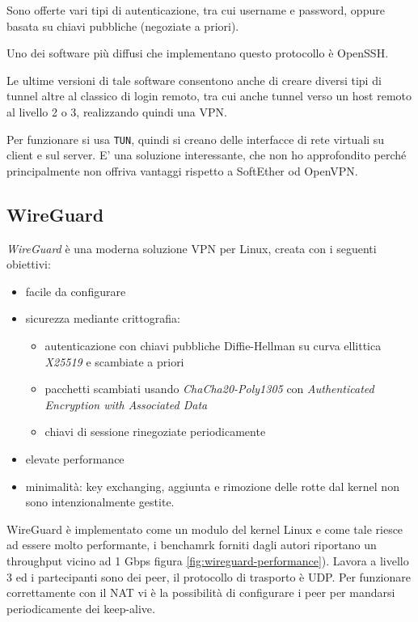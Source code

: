 Sono offerte vari tipi di autenticazione, tra cui username e password, oppure basata
su chiavi pubbliche (negoziate a priori).

Uno dei software più diffusi che implementano questo protocollo è OpenSSH.

Le ultime versioni di tale software consentono anche di creare
diversi tipi di tunnel altre al classico di login remoto, tra cui anche tunnel verso
un host remoto al livello 2 o 3, realizzando quindi una VPN.

Per funzionare si usa \texttt{TUN}, quindi si creano delle interfacce di rete virtuali
su client e sul server. E' una soluzione interessante, che non ho approfondito
perché principalmente non offriva vantaggi rispetto a SoftEther od OpenVPN.

\subsection{WireGuard}
\textit{WireGuard} è una moderna soluzione VPN per Linux, creata con i seguenti obiettivi:
\begin{itemize}
  \item facile da configurare
  \item sicurezza mediante crittografia:
  \begin{itemize}
    \item autenticazione con chiavi pubbliche Diffie-Hellman su curva ellittica \textit{X25519}
    e scambiate a priori
    \item pacchetti scambiati usando \textit{ChaCha20-Poly1305} con \textit{Authenticated
    Encryption with Associated Data}
    \item chiavi di sessione rinegoziate periodicamente
  \end{itemize}
  \item elevate performance
  \item minimalità: key exchanging, aggiunta e rimozione delle rotte dal kernel
  non sono intenzionalmente gestite.
\end{itemize}
WireGuard è implementato come un modulo del kernel Linux e come tale riesce ad essere
molto performante, i benchamrk forniti dagli autori riportano un throughput vicino
ad 1 Gbps figura \ref{fig:wireguard-performance}).
Lavora a livello 3 ed i partecipanti sono dei peer,
il protocollo di trasporto è UDP. Per funzionare correttamente con il NAT vi è
la possibilità di configurare i peer per mandarsi periodicamente dei keep-alive.


